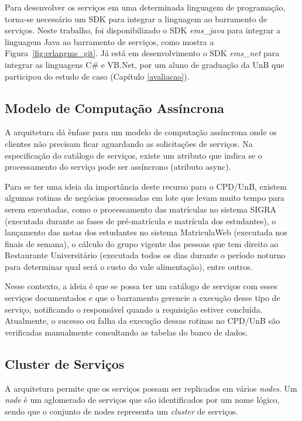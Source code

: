 Para desenvolver os serviços em uma determinada linguagem de programação, 
torna-se necessário um \acrfull{SDK} para integrar a linguagem ao barramento de serviços. Neste trabalho, foi disponibilizado o \acrshort{SDK} \emph{ems\_java} para integrar
a linguagem Java ao barramento de serviços, como mostra a Figura~\ref{fig:erlangms_git}. 
Já está em desenvolvimento
o \acrshort{SDK} \emph{ems\_net} para 
integrar as linguagens C\# e VB.Net,
por um aluno de graduação
da \acrshort{UnB}
que participou do estudo de caso (Capítulo \ref{avaliacao}).



\subsection{Modelo de Computação Assíncrona}\label{modelo_computacao}

A arquitetura dá ênfase para um modelo de 
computação assíncrona onde os clientes não precisam ficar aguardando 
as solicitações de serviços. Na especificação do catálogo de serviços,
existe um atributo que indica se o processamento do serviço
pode ser assíncrono (atributo async).


Para se ter uma ideia da importância deste recurso para o CPD/UnB, existem algumas
rotinas de negócios processadas em lote que levam muito tempo para serem executadas, como o processamento 
das matrículas no sistema \acrshort{SIGRA} (executada durante as fases 
de pré-matrícula e matrícula dos estudantes), o lançamento das notas dos 
estudantes no sistema MatriculaWeb (executada nos finais de semana), o cálculo 
do grupo vigente das pessoas
que tem direito ao Restaurante Universitário (executada todos os 
dias durante o período noturno para determinar qual será o custo do vale alimentação), entre outros. 

Nesse contexto, a ideia é que se possa ter um catálogo de serviços com esses 
serviços documentados e que o 
barramento gerencie a execução 
desse tipo de serviço, notificando o responsável quando a 
requisição estiver concluída. Atualmente, o sucesso ou falha da execução 
dessas rotinas no CPD/UnB são verificadas manualmente consultando as tabelas do banco de dados.


\subsection{Cluster de Serviços}\label{cluster_servico}


A arquitetura permite que os serviços possam ser replicados em vários \textit{nodes}. Um \textit{node} é um aglomerado de serviços que são identificados por um nome lógico, sendo que o conjunto de nodes representa
um \textit{cluster} de serviços.

